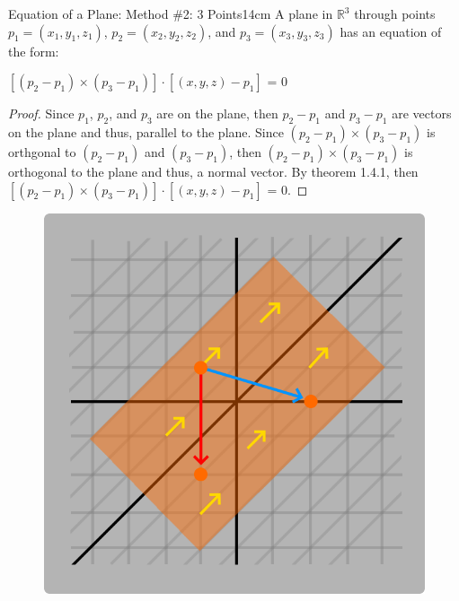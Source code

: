     \begin{wtheorem}{Equation of a Plane: Method \#2: 3 Points}{14cm}
        A plane in $\mathbb{R}^3$ through points
        $p_1 = (x_1,y_1,z_1)$, $p_2 = (x_2,y_2,z_2)$, and $p_3 = (x_3,y_3,z_3)$
        has an equation of the form:

        \hspace{0.5cm}
        $[(p_2 - p_1) \times (p_3 - p_1)] \cdot [(x,y,z) - p_1]$ = 0
    \end{wtheorem}

    \begin{proof}
        Since $p_1$, $p_2$, and $p_3$ are on the plane, then
        $p_2-p_1$ and $p_3-p_1$ are vectors on the plane and thus, parallel to
        the plane.
        Since $(p_2 - p_1) \times (p_3 - p_1)$ is orthgonal to
        $(p_2 - p_1)$ and $(p_3 - p_1)$, then $(p_2 - p_1) \times (p_3 - p_1)$
        is orthogonal to the plane and thus, a normal vector.
        By {\color{red} theorem 1.4.1}, then
        $[(p_2 - p_1) \times (p_3 - p_1)] \cdot [(x,y,z) - p_1]$ = 0.
    \end{proof}

    \begin{figure}[h]
        \centering
        \includegraphics[scale=0.3]{Images/1.4.2.png}
    \end{figure}

